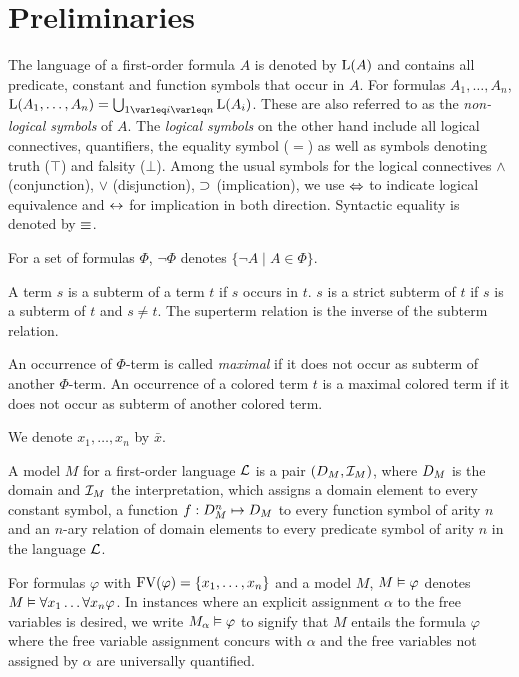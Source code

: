 \section{Preliminaries}


The language of a first-order formula $A$ is denoted by $\operatorname{L}(A)$ and contains all predicate, constant and function symbols that occur in $A$.
For formulas $A_1, \ldots, A_n$, $\Lang(A_1, \ldots, A_n) = \bigcup_{1\varleq i \varleq n} \Lang(A_i)$.
These are also referred to as the \emph{\mbox{non-logical} symbols} of $A$.
The \emph{logical symbols} on the other hand include all logical connectives, quantifiers, the equality symbol ($=$) as well as symbols denoting truth ($\top$) and falsity ($\bot$).
Among the usual symbols for the logical connectives $\land$ (conjunction), $\lor$ (disjunction), $\operatorname{\supset}$ (implication), we use $\operatorname{\Leftrightarrow}$ to indicate logical equivalence and $\operatorname{\leftrightarrow}$ for implication in both direction.
Syntactic equality is denoted by $\equiv$.

For a set of formulas $\Phi$, $\lnot \Phi$ denotes $\{\lnot A \mid A \in \Phi\}$.


A term $s$ is a subterm of a term $t$ if $s$ occurs in $t$. $s$ is a strict subterm of $t$ if $s$ is a subterm of $t$ and $s \neq t$. The superterm relation is the inverse of the subterm relation.

An occurrence of $\Phi$-term is called \emph{maximal} if it does not occur as subterm of another $\Phi$-term.
An occurrence of a colored term $t$ is a maximal colored term if it does not occur as subterm of another colored term.

We denote $x_1, \ldots, x_n$ by $\bar x$.


A model $M$ for a first-order language $\operatorname{\mathcal{L}}$ is a pair $(D_{M}, \mathcal{I}_{M})$, where $D_{M}$ is the domain and $\mathcal{I}_{M}$ the interpretation, which assigns a domain element to every constant symbol, a function $f : D_{M}^n \mapsto D_{M}$ to every function symbol of arity $n$ and an $n$-ary relation of domain elements to every predicate symbol of arity $n$ in the language $\operatorname{\mathcal{L}}$.

For formulas $\varphi$ with $\operatorname{FV}(\varphi) = \{x_1, \dots, x_n\}$ and a model $M$, $M\vDash \varphi$ denotes $M \vDash \forall x_1 \dots \forall x_n \varphi$.
In instances where an explicit assignment $\alpha$ to the free variables is desired,
we write $M_\alpha \vDash \varphi$ 
to signify that $M$ entails the formula $\varphi$ where the free variable assignment concurs with $\alpha$ and the free variables not assigned by $\alpha$ are universally quantified.


